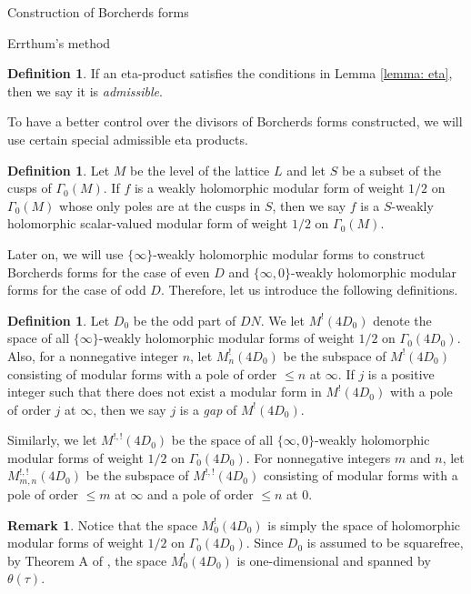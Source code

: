\documentclass{amsart}
\newcounter{lemma}
\theoremstyle{definition}
\newtheorem{Definition}[lemma]{Definition}
\newtheorem{Remark}[lemma]{Remark}
\begin{document}
\begin{section}{Construction of Borcherds forms}
\begin{subsection}{Errthum's method}
\begin{Definition} \label{definition: admissible eta}
  If an eta-product satisfies the conditions in
  Lemma \ref{lemma: eta}, then we say it is \emph{admissible}.
\end{Definition}

To have a better control over the divisors of Borcherds forms
constructed, we will use certain special admissible eta products.

\begin{Definition} Let $M$ be the level of the lattice $L$ and let $S$ be a
  subset of the cusps of $\Gamma_0(M)$. If $f$ is a weakly holomorphic
  modular form of weight $1/2$ on $\Gamma_0(M)$ whose only poles are at the cusps
  in $S$, then we say $f$ is a $S$-weakly holomorphic scalar-valued
  modular form of weight $1/2$ on $\Gamma_0(M)$.
\end{Definition}

Later on, we will use $\{\infty\}$-weakly holomorphic
modular forms to construct Borcherds forms for the case of even $D$
and $\{\infty,0\}$-weakly holomorphic modular forms for the case of
odd $D$. Therefore, let us introduce the following definitions.

\begin{Definition}
  Let $D_0$ be the odd part of $DN$. We let $M^!(4D_0)$ denote the
  space of all $\{\infty\}$-weakly holomorphic modular forms of weight
  $1/2$ on $\Gamma_0(4D_0)$. Also, for a nonnegative integer $n$, let
  $M^!_n(4D_0)$ be the subspace of $M^!(4D_0)$ consisting of modular
  forms with a pole of order $\le n$ at $\infty$.
  If $j$ is a positive integer such that there does not exist a
  modular form in $M^!(4D_0)$ with a pole of order $j$ at $\infty$,
  then we say $j$ is a \emph{gap} of $M^!(4D_0)$.

  Similarly, we let $M^{!,!}(4D_0)$ be the space of all
  $\{\infty,0\}$-weakly holomorphic modular forms of weight $1/2$ on
  $\Gamma_0(4D_0)$. For nonnegative integers $m$ and $n$, let
  $M^{!,!}_{m,n}(4D_0)$ be the subspace of $M^{!,!}(4D_0)$ consisting
  of modular forms with a pole of order $\le m$ at $\infty$ and a pole
  of order $\le n$ at $0$.
\end{Definition}


\begin{Remark}
  Notice that the space $M^!_0(4D_0)$ is simply the space of holomorphic
  modular forms of weight $1/2$ on $\Gamma_0(4D_0)$. Since $D_0$ is
  assumed to be squarefree, by Theorem A of \cite{Serre-Stark}, the
  space $M^!_0(4D_0)$ is one-dimensional and spanned by $\theta(\tau)$.
\end{Remark}


\end{subsection}
\end{section}
\end{document}

